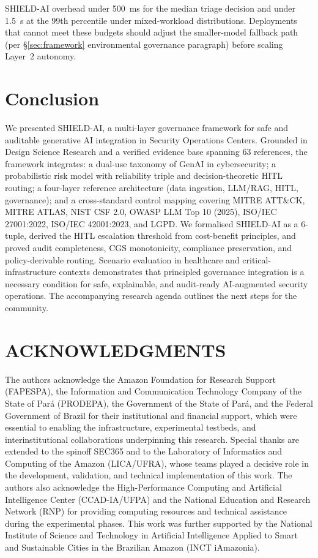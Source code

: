 \documentclass[preprint,12pt,authoryear]{elsarticle}
\begin{document}
SHIELD-AI overhead under 500~ms for the median triage decision and under 1.5~s at the 99th percentile under mixed-workload distributions. Deployments that cannot meet these budgets should adjust the smaller-model fallback path (per §\ref{sec:framework} environmental governance paragraph) before scaling Layer~2 autonomy.

\section{Conclusion}
\label{sec:conclusion}
We presented SHIELD-AI, a multi-layer governance framework for safe and auditable generative AI integration in Security Operations Centers. Grounded in Design Science Research and a verified evidence base spanning 63 references, the framework integrates: a dual-use taxonomy of GenAI in cybersecurity; a probabilistic risk model with reliability triple and decision-theoretic HITL routing; a four-layer reference architecture (data ingestion, LLM/RAG, HITL, governance); and a cross-standard control mapping covering MITRE ATT\&CK, MITRE ATLAS, NIST CSF 2.0, OWASP LLM Top 10 (2025), ISO/IEC 27001:2022, ISO/IEC 42001:2023, and LGPD. We formalised SHIELD-AI as a 6-tuple, derived the HITL escalation threshold from cost-benefit principles, and proved audit completeness, CGS monotonicity, compliance preservation, and policy-derivable routing. Scenario evaluation in healthcare and critical-infrastructure contexts demonstrates that principled governance integration is a necessary condition for safe, explainable, and audit-ready AI-augmented security operations. The accompanying research agenda outlines the next steps for the community.

\section*{ACKNOWLEDGMENTS}
The authors acknowledge the Amazon Foundation for Research Support (FAPESPA), the
Information and Communication Technology Company of the State of Par\'{a} (PRODEPA),
the Government of the State of Par\'{a}, and the Federal Government of Brazil for their
institutional and financial support, which were essential to enabling the infrastructure,
experimental testbeds, and interinstitutional collaborations underpinning this research.
Special thanks are extended to the spinoff SEC365 and to the Laboratory of Informatics
and Computing of the Amazon (LICA/UFRA), whose teams played a decisive role in the
development, validation, and technical implementation of this work.
The authors also acknowledge the High-Performance Computing and Artificial Intelligence
Center (CCAD-IA/UFPA) and the National Education and Research Network (RNP) for
providing computing resources and technical assistance during the experimental phases.
This work was further supported by the National Institute of Science and Technology in
Artificial Intelligence Applied to Smart and Sustainable Cities in the Brazilian Amazon
(INCT iAmazonia).
\end{document}

